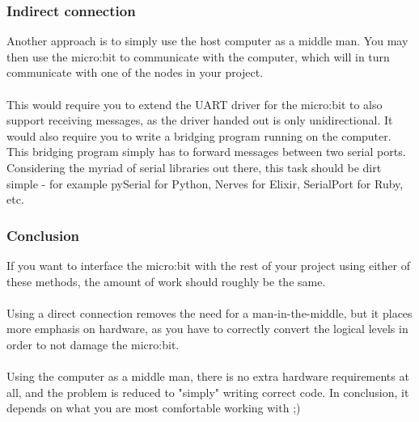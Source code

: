 \documentclass[11pt,a4paper]{article}
\begin{document}
\subsubsection{Indirect connection}
Another approach is to simply use the host computer as a middle man. You may then use the micro:bit to communicate with the computer, which will in turn communicate with one of the nodes in your project.\\
\\
This would require you to extend the UART driver for the micro:bit to also support receiving messages, as the driver handed out is only unidirectional. It would also require you to write a bridging program running on the computer. This bridging program simply has to forward messages between two serial ports. Considering the myriad of serial libraries out there, this task should be dirt simple - for example pySerial for Python, Nerves for Elixir, SerialPort for Ruby, etc.

\subsubsection{Conclusion}
If you want to interface the micro:bit with the rest of your project using either of these methods, the amount of work should roughly be the same.\\
\\
Using a direct connection removes the need for a man-in-the-middle, but it places more emphasis on hardware, as you have to correctly convert the logical levels in order to not damage the micro:bit.\\
\\
Using the computer as a middle man, there is no extra hardware requirements at all, and the problem is reduced to "simply" writing correct code. In conclusion, it depends on what you are most comfortable working with ;)

\newpage
\noindent
\appendix
\end{document}
